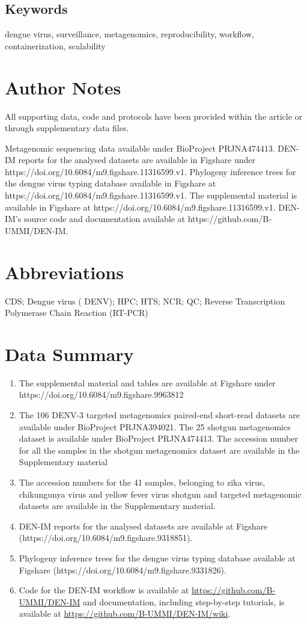 \subsection{Keywords}
dengue virus, surveillance, metagenomics, reproducibility, workflow, containerization, scalability
 
\section{Author Notes}
All supporting data, code and protocols have been provided within the article or through supplementary data files.

Metagenomic sequencing data available under BioProject PRJNA474413. DEN-IM reports for the analysed datasets are available in Figshare under https://doi.org/10.6084/m9.figshare.11316599.v1. Phylogeny inference trees for the dengue virus typing database available in Figshare at https://doi.org/10.6084/m9.figshare.11316599.v1. The supplemental material is available in Figshare at https://doi.org/10.6084/m9.figshare.11316599.v1. DEN-IM’s source code and documentation available at https://github.com/B-UMMI/DEN-IM.

\section{Abbreviations}
 
\ac{CDS}; 
Dengue virus ( \ac{DENV}); 
\ac{HPC}; 
\ac{HTS}; 
\ac{NCR}; 
\ac{QC}; 
Reverse Transcription Polymerase Chain Reaction (\ac{RT-PCR})

\section{Data Summary}

\begin{enumerate}
    \item The supplemental material and tables are available at Figshare under https://doi.org/10.6084/m9.figshare.9963812
    \item The 106 DENV-3 targeted metagenomics paired-end short-read datasets are available under BioProject PRJNA394021. The 25 shotgun metagenomics dataset is available under BioProject PRJNA474413. The accession number for all the samples in the shotgun metagenomics dataset are available in the Supplementary material
    \item The accession numbers for the 41 samples, belonging to zika virus, chikungunya virus and yellow fever virus shotgun and targeted metagenomic datasets are available in the Supplementary material. 
    \item DEN-IM reports for the analysed datasets are available at Figshare  (https://doi.org/10.6084/m9.figshare.9318851).
    \item Phylogeny inference trees for the dengue virus typing database available at Figshare (https://doi.org/10.6084/m9.figshare.9331826).
    \item Code for the DEN-IM workflow is available at \url{https://github.com/B-UMMI/DEN-IM} and documentation, including step-by-step tutorials, is available at \url{https://github.com/B-UMMI/DEN-IM/wiki}.
\end{enumerate}

